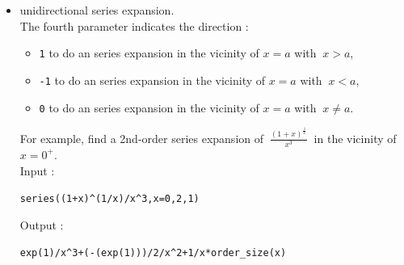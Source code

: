 \documentclass[a4paper,11pt]{book}
\begin{document}
\begin{itemize}
\begin{enumerate}
Output :
\begin{center}{\tt pi/2-1/x+1/3*(1/x)\verb|^|3+1/-5*(1/x)\verb|^|5+
(1/x)\verb|^|6*order\_size(1/x)}\end{center}
Note that the expansion variable and the argument of the 
{\tt order\_size} function is
$\displaystyle h=\frac{1}{x} \rightarrow_{x\rightarrow + \infty} 0 $.
\item
Find a series 2nd-order expansion of $(2x-1)e^{\frac{1}{x-1}}$ in the vicinity of
{\tt x=+$\infty$}. \\
Input :
\begin{center}{\tt series((2*x-1)*exp(1/(x-1)),x=+infinity,3)}\end{center}
Output is only a 1st-order series expansion :
\begin{center}{\tt  2*x+1+2/x+(1/x)\verb|^|2*order\_size(1/x)}\end{center}
To get a 2nd-order series expansion in $1/x$, input:
\begin{center}{\tt series((2*x-1)*exp(1/(x-1)),x=+infinity,4)}\end{center}
Output :
\begin{center}{\tt
    2*x+1+2/x+17/6*(1/x)\verb|^|2+(1/x)\verb|^|3*order\_size(1/x)}\end{center}
\item
Find a 2nd-order series expansion of $(2x-1)e^{\frac{1}{x-1}}$ in the vicinity 
of {\tt x=-$\infty$}.\\
Input :
\begin{center}{\tt series((2*x-1)*exp(1/(x-1)),x=-infinity,4)}\end{center}
Output :
\begin{center}{\tt -2*(-x)+1-2*(-1/x)+17/6*(-1/x)\verb|^|2+\\
(-1/x)\verb|^|3*order\_size(-1/x)}\end{center}
\end{enumerate}
\item unidirectional series expansion.\\
The fourth parameter indicates the direction :
\begin{itemize}
\item {\tt 1} to do an series expansion in the vicinity of $x=a$ with 
$ \ x>a$,
\item{\tt -1} to do an series expansion in the vicinity of $x=a$ with 
$ \ x<a$,
\item{\tt 0}  to do an series expansion in the vicinity of $x=a$ with 
$ \ x \neq a$.
\end{itemize}
For example, 
find a 2nd-order series expansion of $\ \frac{(1+x)^{\frac{1}{x}}}{x^3}\ $ in 
the vicinity of $x=0^+$.\\
Input :
\begin{center}{\tt series((1+x)\verb|^|(1/x)/x\verb|^|3,x=0,2,1)}\end{center}
Output :
\begin{center}{\tt exp(1)/x\verb|^|3+(-(exp(1)))/2/x\verb|^|2+1/x*order\_size(x)}\end{center}
\end{itemize}
\end{document}
